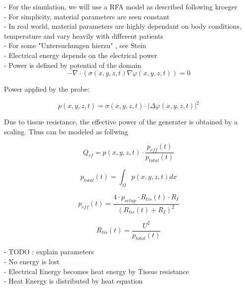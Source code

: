 \documentclass[parskip=half, titlepage=yes, 12pt, BCOR=12mm, DIV=calc]{scrartcl}
\begin{document}
- For the simulation, we will use a RFA model as described following kroeger \\
- For simplicity, material parameters are seen constant \\
- In real world, material parameters are highly dependant on body conditions, temperature and vary heavily with different patients \\
- For some "Untersuchungen hierzu" , see Stein \\

- Electrical energy depends on the electrical power \\
- Power is defined by potential of the domain \\

\begin{equation}
    - \nabla \cdot (\sigma(x,y,z,t) \nabla \varphi(x,y,z,t)) = 0
\end{equation}

Power applied by the probe:

\begin{equation}
    p(x,y,z,t) = \sigma(x,y,z,t) \cdot |\Delta \varphi(x,y,z,t)|^2
\end{equation}

Due to tissue resistance, the effective power of the generater is obtained by a scaling. Thus can be modeled as follwing   

\begin{equation}
    Q_{rf} = p(x,y,z,t) \cdot \frac{p_{eff}(t)}{p_{total}(t)} 
\end{equation}

\begin{equation}
    p_{total}(t) = \int_{\Omega} p(x,y,z,t) dx
\end{equation}

\begin{equation}
    p_{eff}(t) = \frac{4 \cdot p_{setup} \cdot R_{tis}(t) \cdot R_I}{(R_{tis}(t) + R_I)^2}
\end{equation}

\begin{equation}
    R_{tis}(t) = \frac{U^2}{p_{total}(t)}
\end{equation}

- TODO : explain parameters \\

- No energy is lost \\
- Electrical Energy becomes heat energy by Tissue resistance \\
- Heat Energy is distributed by heat equation \\
\end{document}

